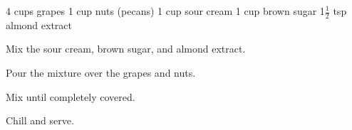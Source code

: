\dishtype{\side}
\dishother{\vegetarian}
\begin{ingreds}
    4 cups grapes
    1 cup nuts (pecans)
    1 cup sour cream
    1 cup brown sugar
    1$\frac{1}{2}$ tsp almond extract
\end{ingreds}
\begin{method}
    Mix the sour cream, brown sugar, and almond extract.\par
    Pour the mixture over the grapes and nuts.\par
    Mix until completely covered.\par
    Chill and serve.
\end{method}